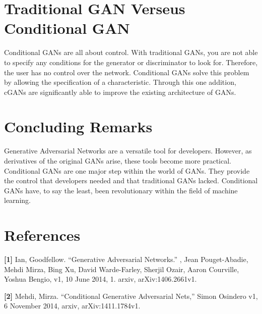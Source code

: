 \documentclass{cup-pan}
\begin{document}
\section{Traditional GAN Verseus Conditional GAN}
Conditional GANs are all about control. With traditional GANs, you are not able to specify any conditions for the generator or discriminator to look for. Therefore, the user has no control over the network. Conditional GANs solve this problem by allowing the specification of a characteristic. Through this one addition, cGANs are significantly able to improve the existing architecture of GANs.  

\section{Concluding Remarks}
Generative Adversarial Networks are a versatile tool for developers. However, as derivatives of the original GANs arise, these tools become more practical. Conditional GANs are one major step within the world of GANs. They provide the control that developers needed and that traditional GANs lacked. Conditional GANs have, to say the least, been revolutionary within the field of machine learning.   

\section{References}
\noindent \textbf{[1]} Ian, Goodfellow. “Generative Adversarial Networks.” , Jean Pouget-Abadie, Mehdi Mirza, Bing \indent Xu, David Warde-Farley, Sherjil Ozair, Aaron Courville, Yoshua Bengio, v1, 10 June 2014, 1. arxiv,  \indent arXiv:1406.2661v1. 

\noindent \textbf{[2]} Mehdi, Mirza. “Conditional Generative Adversarial Nets,” Simon Osindero  v1, 6 November 2014, \indent arxiv, arXiv:1411.1784v1.
\end{document}
